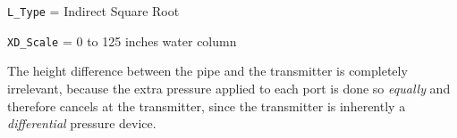 {\tt L\_Type} = Indirect Square Root

\vskip 10pt

{\tt XD\_Scale} = 0 to 125 inches water column

\vskip 10pt

The height difference between the pipe and the transmitter is completely irrelevant, because the extra pressure applied to each port is done so {\it equally} and therefore cancels at the transmitter, since the transmitter is inherently a {\it differential} pressure device.










